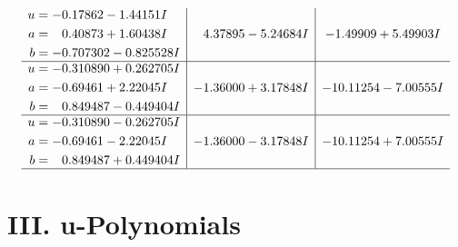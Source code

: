 \documentclass[1p]{elsarticle_modified}
\theoremstyle{definition}
\begin{document}
$$\begin{array}{c|c|c}
\begin{aligned}
u &= -0.17862 - 1.44151 I \\
a &= \phantom{-}0.40873 + 1.60438 I \\
b &= -0.707302 - 0.825528 I\end{aligned}
 & \phantom{-}4.37895 - 5.24684 I & -1.49909 + 5.49903 I \\ \hline\begin{aligned}
u &= -0.310890 + 0.262705 I \\
a &= -0.69461 + 2.22045 I \\
b &= \phantom{-}0.849487 - 0.449404 I\end{aligned}
 & -1.36000 + 3.17848 I & -10.11254 - 7.00555 I \\ \hline\begin{aligned}
u &= -0.310890 - 0.262705 I \\
a &= -0.69461 - 2.22045 I \\
b &= \phantom{-}0.849487 + 0.449404 I\end{aligned}
 & -1.36000 - 3.17848 I & -10.11254 + 7.00555 I\\
 \hline 
 \end{array}$$\newpage
\newpage\renewcommand{\arraystretch}{1}
\centering \section*{ III. u-Polynomials}
\end{document}
